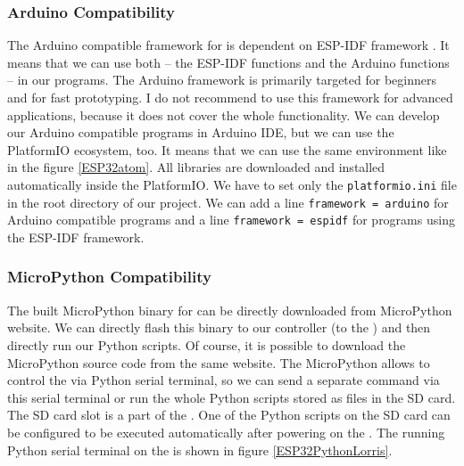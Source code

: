 \subsubsection{Arduino Compatibility}
The Arduino compatible framework for  \cite{espressif:ArduinoCore} is dependent on \ac{ESP-IDF} framework \cite{espressif:ESP-IDF}. It means that we can use both -- the \ac{ESP-IDF} functions and the Arduino functions -- in our programs. The Arduino framework is primarily targeted for beginners and for fast prototyping. I do not recommend to use this framework for advanced applications, because it does not cover the whole  functionality. We can develop our Arduino compatible programs in Arduino IDE, but we can use the PlatformIO ecosystem, too. It means that we can use the same environment like in the figure \ref{ESP32atom}. All libraries are downloaded and installed automatically inside the PlatformIO. We have to set only the \texttt{platformio.ini} file in the root directory of our project. We can add a line \texttt{framework = arduino} for Arduino compatible programs and a line \texttt{framework = espidf} for programs using the \ac{ESP-IDF} framework.

\subsubsection{MicroPython Compatibility}
The built MicroPython binary for  can be directly downloaded from MicroPython website. \cite{MicroPython} We can directly flash this binary to our  controller (to the ) and then directly run our Python scripts. Of course, it is possible to download the MicroPython source code from the same website. The MicroPython allows to control the  via Python serial terminal, so we can send a separate command via this serial terminal or run the whole Python scripts stored as files in the SD card. The SD card slot is a part of the . One of the Python scripts on the SD card can be configured to be executed automatically after powering on the . The running Python serial terminal on the  is shown in figure \ref{ESP32PythonLorris}.

